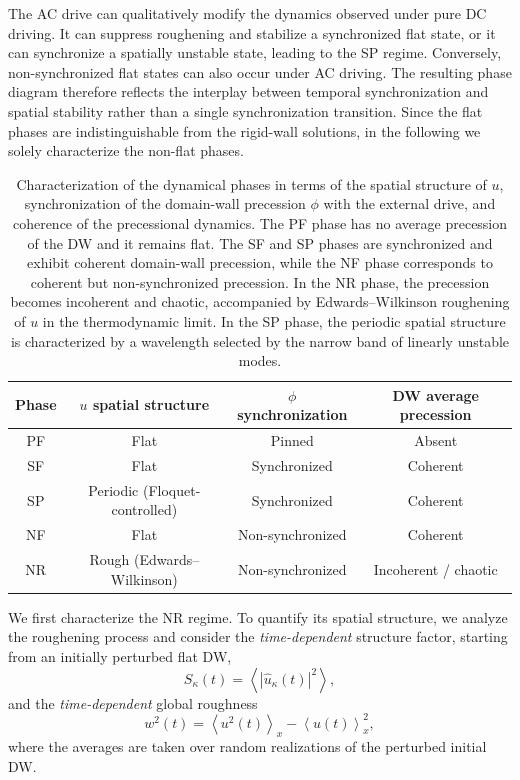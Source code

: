 \documentclass[prb,aps,twocolumn,superscriptaddress,floatfix]{revtex4-2}
\begin{document}
The AC drive can qualitatively modify the dynamics observed under pure DC driving. It can suppress roughening and stabilize a synchronized flat state, or it can synchronize a spatially unstable state, leading to the SP regime. Conversely, non-synchronized flat states can also occur under AC driving. The resulting phase diagram therefore reflects the interplay between temporal synchronization and spatial stability rather than a single synchronization transition. Since the flat phases are indistinguishable from the rigid-wall solutions, in the following we solely characterize the non-flat phases.

\begin{table}[t]
\caption{Characterization of the dynamical phases in terms of the spatial structure of $u$, synchronization of the domain-wall precession $\phi$ with the external drive, and coherence of the precessional dynamics. The PF phase has no average precession of the DW and it remains flat. The SF and SP phases are synchronized and exhibit coherent domain-wall precession, while the NF phase corresponds to coherent but non-synchronized precession. In the NR phase, the precession becomes incoherent and chaotic, accompanied by Edwards--Wilkinson roughening of $u$ in the thermodynamic limit. In the SP phase, the periodic spatial structure is characterized by a wavelength selected by the narrow band of linearly unstable modes.}
\label{tab:phases}
\begin{ruledtabular}
\begin{tabular}{cccc}
Phase & $u$ spatial structure & $\phi$ synchronization & DW average precession \\
\hline
PF & Flat & Pinned & Absent \\
SF & Flat & Synchronized & Coherent \\
SP & Periodic (Floquet-controlled) & Synchronized & Coherent \\
NF & Flat & Non-synchronized & Coherent \\
NR & Rough (Edwards--Wilkinson) & Non-synchronized & Incoherent / chaotic \\
\end{tabular}
\end{ruledtabular}
\end{table}

We first characterize the NR regime. To quantify its spatial structure, we analyze the roughening process and consider the \textit{time-dependent} structure factor, starting from an initially perturbed flat DW,
\begin{equation}
    S_\kappa(t) = \left\langle\left|\hat u_\kappa(t)\right|^2\right\rangle ,
    \label{eq:factor_estructura}
\end{equation}
and the \textit{time-dependent} global roughness
\begin{equation}
w^2(t) =
\left\langle u^2(t)\right\rangle_x
-\left\langle u(t)\right\rangle_x^2 ,
\label{eq:roughness}
\end{equation}
where the averages are taken over random realizations of the perturbed initial DW.
\end{document}
